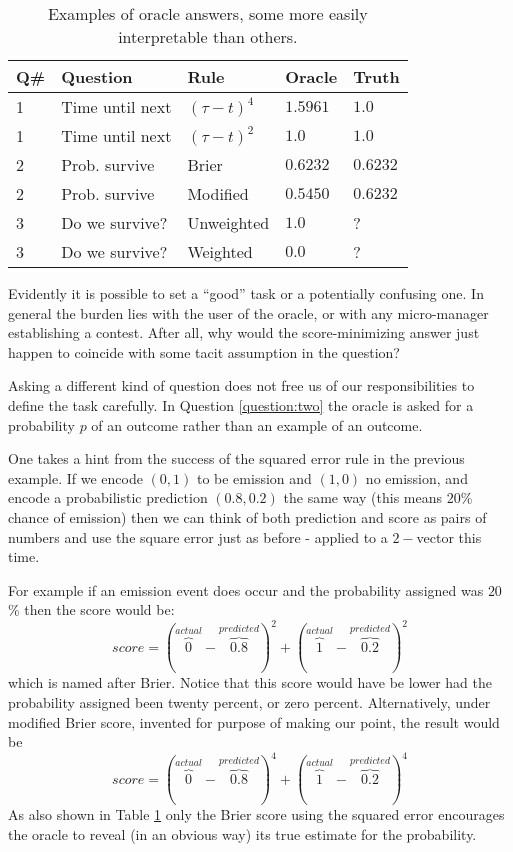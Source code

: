 \begin{table}
\begin{tabular}{|l|l|l|l|l|}
\hline 
     Q\# & Question & Rule & Oracle & Truth    \\
     \hline
     1 & Time until next  &  $(\tau-t)^4$ & $1.5961$ & $1.0$ \\
     1 & Time until next  &  $(\tau-t)^2$ & $1.0$    & $1.0$ \\
     2 & Prob. survive & Brier & $0.6232$ & $0.6232$ \\
     2 & Prob. survive & Modified & $0.5450$ & $0.6232$ \\
     3 & Do we survive? & Unweighted & $1.0$       &  ?   \\ 
     3 & Do we survive? & Weighted  &  $0.0$  & ? \\
     \hline 
\end{tabular}
\caption{Examples of oracle answers, some more easily interpretable than others.}
\label{tab:bias}
\end{table}
Evidently it is possible to set a ``good'' task or a potentially confusing one. In general the burden lies with the user of the oracle, or with any micro-manager establishing a contest. After all, why would the score-minimizing answer just happen to coincide with some tacit assumption in the question?

Asking a different kind of question does not free us of our responsibilities to define the task carefully. In Question \ref{question:two} the oracle is asked for a probability $p$ of an outcome rather than an example of an outcome. 

One takes a hint from the success of the squared error rule in the previous example. If we encode $(0,1)$ to be emission and $(1,0)$ no emission, and encode a probabilistic prediction $(0.8,0.2)$ the same way (this means $20$\% chance of emission) then we can think of both prediction and score as pairs of numbers and use the square error just as before - applied to a $2-$vector this time. 

For example if an emission event does occur and the probability assigned was $20$\% then the score would be: 
$$
    score = (\overbrace{0}^{actual}-\overbrace{0.8}^{predicted})^2 + (\overbrace{1}^{actual}-\overbrace{0.2}^{predicted})^2
$$
which is named after Brier. Notice that this score would have be lower had the probability assigned been twenty percent, or zero percent. Alternatively, under  modified Brier score, invented for purpose of making our point, the result would be
$$
    score = (\overbrace{0}^{actual}-\overbrace{0.8}^{predicted})^4 + (\overbrace{1}^{actual}-\overbrace{0.2}^{predicted})^4
$$
As also shown in Table \ref{tab:bias} only the Brier score using the squared error encourages the oracle to reveal (in an obvious way) its true estimate for the probability.  

